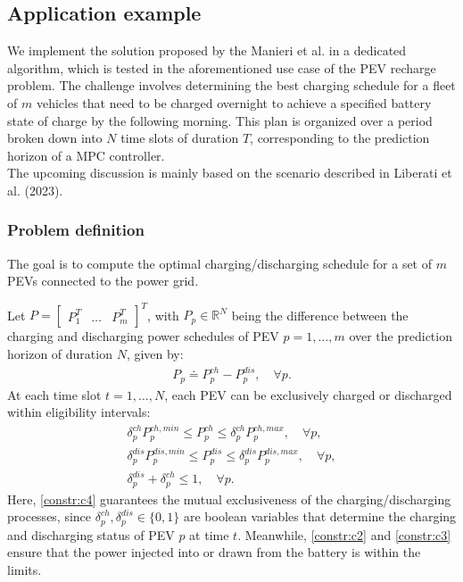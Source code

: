 \subsection{Application example}
We implement the solution proposed by the Manieri et al. in a dedicated algorithm, which is tested in the aforementioned use case of the PEV recharge problem. The challenge involves determining the best charging schedule for a fleet of $m$ vehicles that need to be charged overnight to achieve a specified battery state of charge by the following morning. This plan is organized over a period broken down into $N$ time slots of duration $T$, corresponding to the prediction horizon of a MPC controller. 
\\The upcoming discussion is mainly based on the scenario described in Liberati et al. (2023)\supercite{liberati}.

\subsubsection{Problem definition}
The goal is to compute the optimal charging/discharging schedule for a set of $m$ PEVs connected to the power grid.

Let $P = \begin{bmatrix}
    P_1^T & \dots & P_m^T
\end{bmatrix}^T$, with $P_{p} \in \mathbb{R}^N$ being the difference between the charging and discharging power schedules of PEV $p = 1, \dots, m$ over the prediction horizon of duration $N$, given by:
\begin{align}
    P_{p} \doteq P^{ch}_{p}-P^{dis}_{p}, \quad \forall p. \label{constr:c1}
\end{align}
At each time slot $t = 1, \dots, N$, each PEV can be exclusively charged or discharged within eligibility intervals:
\begin{gather}
    \delta^{ch}_{p} P^{ch,min}_p \leq P^{ch}_{p} \leq \delta^{ch}_{p} P^{ch,max}_p, \quad \forall p, \label{constr:c2}\\
    \delta^{dis}_{p} P^{dis,min}_p \leq P^{dis}_{p} \leq \delta^{dis}_{p} P^{dis,max}_p, \quad \forall p, \label{constr:c3}\\
    \delta^{dis}_{p} + \delta^{ch}_{p} \leq 1, \quad \forall p. \label{constr:c4}
\end{gather}
Here, \ref{constr:c4} guarantees the mutual exclusiveness of the charging/discharging processes, since $\delta^{ch}_{p}, \delta^{dis}_{p} \in \{0,1\}$ are boolean variables that determine the charging and discharging status of PEV $p$ at time $t$. Meanwhile, \ref{constr:c2} and \ref{constr:c3} ensure that the power injected into or drawn from the battery is within the limits.

